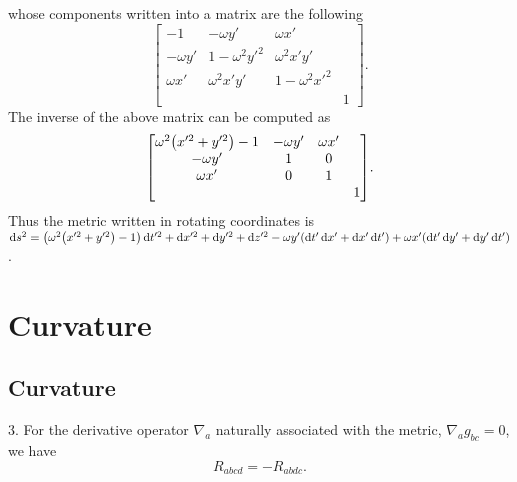 \documentclass{note}
\numberwithin{equation}{chapter}
\newcommand{\diff}{\operatorname{d}\!}
\begin{document}
whose components written into a matrix are the following
\begin{equation*}
    \begin{bmatrix}
        -1         & -\omega y'     & \omega x'          \\
        -\omega y' & 1-\omega^2y'^2 & \omega^2x'y'       \\
        \omega x'  & \omega^2x'y'   & 1-\omega^2x'^2     \\
                   &                &                & 1
    \end{bmatrix}.
\end{equation*}
The inverse of the above matrix can be computed as
\begin{equation*}
    \begin{bmatrix}
        \omega^2\prn{x'^2+y'^2}-1 & -\omega y' & \omega x'     \\
        -\omega y'                & 1          & 0             \\
        \omega x'                 & 0          & 1             \\
                                  &            &           & 1
    \end{bmatrix}.
\end{equation*}
Thus the metric written in rotating coordinates is $\diff s^2 =
    \prn{\omega^2\prn{x'^2+y'^2}-1}\diff t'^2 + \diff x'^2 + \diff y'^2 + \diff
    z'^2 - \omega y'(\diff t'\diff x' + \diff x'\diff t') + \omega x' (\diff
    t'\diff y' + \diff y'\diff t')$.

\chapter{Curvature}

\setcounter{section}{1}

\section{Curvature}


\begin{quotebar}
    3. For the derivative operator $\nabla_a$ naturally associated with the
    metric, $\nabla_ag_{bc}=0$, we have
    \begin{equation*}
        R_{abcd} = - R_{abdc}.
    \end{equation*}
\end{quotebar}
\end{document}
